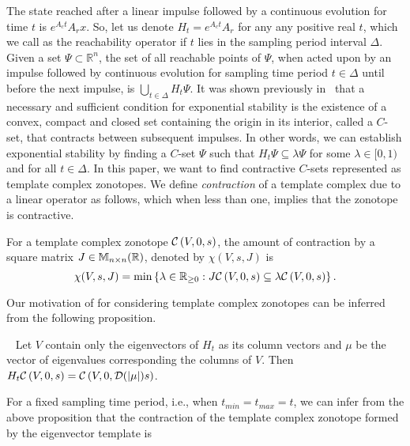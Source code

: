 
The state reached after a linear impulse followed by a continuous
evolution for time $t$ is $e^{A_ct}A_rx$.  So, let us denote
$H_t=e^{A_ct}A_r$ for any any positive real $t$, which we call as the
reachability operator if $t$ lies in the sampling period interval
$\Delta$.  Given a set $\Psi\subset\mathbb{R}^n$, the set of all
reachable points of $\Psi$, when acted upon by an impulse followed by
continuous evolution for sampling time period $t\in\Delta$ until
before the next impulse, is $\bigcup_{t\in\Delta}H_t\Psi$.  It was
shown previously in~\cite{2014-fiacchini-set,AlKhatib2015} that a
necessary and sufficient condition for exponential stability is the
existence of a convex, compact and closed set containing the origin in
its interior, called a $C$-set, that contracts between subsequent
impulses.  In other words, we can establish exponential stability by
finding a $C$-set $\Psi$ such that $H_t\Psi\subseteq\lambda\Psi$ for
some $\lambda\in[0,1)$ and for all $t\in\Delta$.  In this paper, we
  want to find contractive $C$-sets represented as template complex
  zonotopes.  We define \emph{contraction} of a
template complex due to a linear operator as follows, which when less
than one, implies that the zonotope is contractive.
%
\begin{defn}
For a template complex zonotope $\mathcal{C}\left(V,0,s\right)$, the amount of contraction by a
square matrix $J\in\mathbb{M}_{n\times n}(\mathbb{R})$, denoted by $\chi(V,s,J)$
is \[\chi(V,s,J)=\min\left\{\lambda\in\mathbb{R}_{\geq 0}:J\mathcal{C}\left(V,0,s\right)\subseteq
\lambda\mathcal{C}\left(V,0,s\right)\right\}.\]
\end{defn}
%
Our motivation of for considering
template complex zonotopes can be
inferred from the following proposition.  
%
\begin{prop}~\label{prop:eig-cont}
  Let $V$ contain only the eigenvectors of $H_t$ as its column vectors
  and $\mu$ be the vector of eigenvalues corresponding the columns of
  $V$.  Then $H_t\mathcal{C}\left(V,0,s\right)=\mathcal{C}\left(V,0,\mathcal{D}(|\mu|)s\right)$.
\end{prop}
%
For a fixed sampling time period, i.e., when $t_{min}=t_{max}=t$, we
can infer from the above proposition that the contraction of the
template complex zonotope formed by the eigenvector template is
